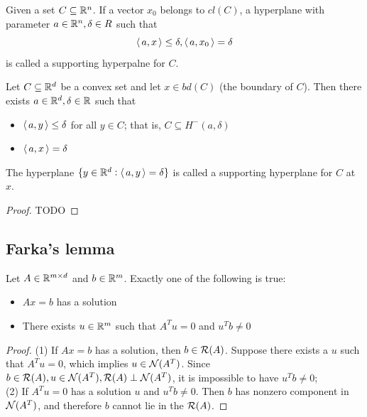 \begin{refsection}
\begin{definition}
Given a set $C\subseteq \mathbb{R}^n$. If a vector $x_0$ belongs to $cl(C)$, a hyperplane with parameter $a\in \mathbb{R}^n,\delta\in R$ such that
$${\left< \, a,x \, \right>}\leq \delta, {\left< \, a,x_0 \, \right>}=\delta$$
is called a supporting hyperpalne for $C$.
\end{definition}

\begin{theorem}\cite[67]{bertsekas2009convex}
	Let $C\subseteq \mathbb{R}^d$ be a convex set and let $x\in bd(C)$ (the boundary of $C$). Then there exists $a\in\mathbb{R}^d, \delta\in \mathbb{R}$ such that 
	\begin{itemize}
		\item ${\left< \, a,y \, \right>}\leq \delta$ for all $y\in C$; that is, $C\subseteq H^-(a,\delta)$
		\item ${\left< \, a,x \, \right>} = \delta$
	\end{itemize}
	The hyperplane $\{y\in \mathbb{R}^d:{\left< \, a,y \, \right>} = \delta\}$ is called a supporting hyperplane for $C$ at $x$.
\end{theorem}
\begin{proof}
	TODO	
\end{proof}


\subsection{Farka's lemma}
\begin{theorem}
	Let $A\in \mathbb{R}^{m\times d}$ and $b\in \mathbb{R}^m$. Exactly one of the following is true:
	\begin{itemize}
		\item $Ax = b$ has a solution
		\item There exists $u\in \mathbb{R}^m$ such that $A^Tu = 0$ and $u^Tb\neq 0$
	\end{itemize}
\end{theorem}
\begin{proof}
(1) If $Ax=b$ has a solution, then $b\in \mathcal{R}(A)$. Suppose there exists a $u$ such that $A^Tu = 0$, which implies $u\in \mathcal{N}(A^T)$. Since $b\in \mathcal{R}(A),u\in \mathcal{N}(A^T),\mathcal{R}(A)\perp \mathcal{N}(A^T)$, it is impossible to have $u^Tb\neq 0$; \\
(2) If $A^Tu = 0$ has a solution $u$ and $u^Tb \neq 0$. Then $b$ has nonzero component in $\mathcal{N}(A^T)$, and therefore $b$ cannot lie in the $\mathcal{R}(A)$.
\end{proof}




\end{refsection}
